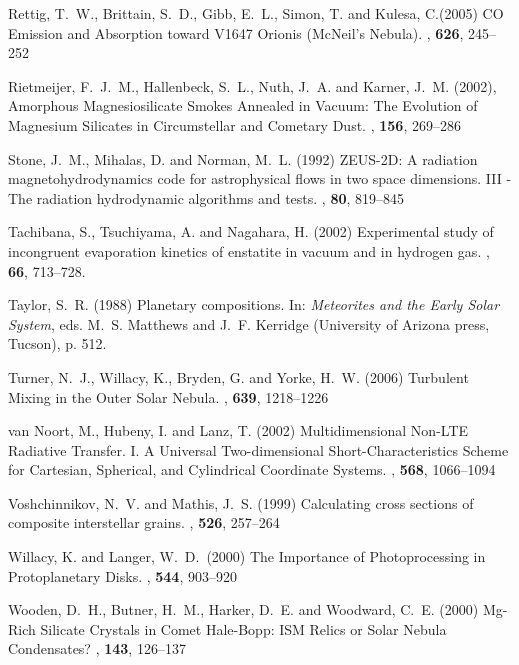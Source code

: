 \begin{literature}
\item
Rettig, T.~W., Brittain, S.~D., Gibb, E.~L., Simon, T. and Kulesa, C.(2005)
CO Emission and Absorption toward V1647 Orionis (McNeil's Nebula). \apj,
\textbf{626}, 245--252

\item
Rietmeijer, F.~J.~M., Hallenbeck, S.~L., Nuth, J.~A. and Karner, J.~M. (2002),
Amorphous Magnesiosilicate Smokes Annealed in Vacuum: The Evolution of Magnesium
Silicates in Circumstellar and Cometary Dust. \ica, \textbf{156},  269--286

\item
Stone, J.~M., Mihalas, D. and Norman, M.~L. (1992) ZEUS-2D: A radiation
magnetohydrodynamics code for astrophysical flows in two space dimensions.
III - The radiation hydrodynamic algorithms and tests. \apjs, \textbf{80}, 819--845

\item
Tachibana, S., Tsuchiyama, A. and Nagahara, H. (2002) Experimental study of
incongruent evaporation kinetics of enstatite in vacuum and in hydrogen gas.
\gca, \textbf{66}, 713--728.

\item
Taylor, S.~R. (1988) Planetary compositions. In: \textit{Meteorites and the
Early Solar System}, eds. M.~S. Matthews and J.~F. Kerridge (University of Arizona press, Tucson), p. 512.

\item
Turner, N.~J., Willacy, K., Bryden, G. and Yorke, H.~W. (2006) Turbulent Mixing
in the Outer Solar Nebula. \apj, \textbf{639}, 1218--1226

\item
van Noort, M., Hubeny, I. and Lanz, T. (2002) Multidimensional Non-LTE Radiative
Transfer. I. A Universal Two-dimensional Short-Characteristics Scheme for
Cartesian, Spherical, and Cylindrical Coordinate Systems. \apj, \textbf{568},
1066--1094

\item
Voshchinnikov, N.~V. and Mathis, J.~S. (1999) Calculating cross sections
of composite interstellar grains. \apj, \textbf{526}, 257--264

\item
Willacy, K. and Langer, W.~D.\ (2000) The Importance of Photoprocessing in
Protoplanetary Disks. \apj, \textbf{544}, 903--920

\item
Wooden, D.~H., Butner, H.~M., Harker, D.~E. and Woodward, C.~E. (2000) Mg-Rich
Silicate Crystals in Comet Hale-Bopp: ISM Relics or Solar Nebula Condensates?
\ica, \textbf{143}, 126--137


\end{literature}
